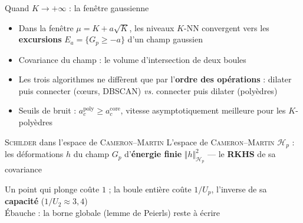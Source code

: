 \begin{frame}{Quand $K \to +\infty$ : la fenêtre gaussienne}
    \begin{itemize}
        \setlength{\itemsep}{10pt}
        \item Dans la fenêtre $\mu = K + a\sqrt K$, les niveaux $K$-NN convergent vers les \textbf{excursions} $E_a = \{G_p \ge -a\}$ d'un champ gaussien
        \item Covariance du champ : le volume d'intersection de deux boules
        \item Les trois algorithmes ne diffèrent que par l'\textbf{ordre des opérations} : dilater puis connecter (cœurs, DBSCAN) \emph{vs.} connecter puis dilater (polyèdres)
        \item Seuils de bruit : $a_c^{\mathrm{poly}} \ge a_c^{\mathrm{core}}$, vitesse asymptotiquement meilleure pour les $K$-polyèdres
    \end{itemize}
\end{frame}

\begin{frame}[t]{\textsc{Schilder} dans l'espace de \textsc{Cameron}--\textsc{Martin}}
    \small
    L'espace de \textsc{Cameron}--\textsc{Martin} $\mathcal H_p$  : les déformations $h$ du champ
    $G_p$ d'\textbf{énergie finie} $\Vert h\Vert^2_{\mathcal H_p}$ --- le \textbf{RKHS} de sa covariance 

    \vspace{0.10cm}
    \begin{center}
    \end{center}

    \vspace{0.08cm}
    \begin{center}
        \resizebox{0.46\textwidth}{!}{}
    \end{center}

    \vspace{0.04cm}
    \begin{center}
        Un point qui plonge coûte $1$ ; la boule entière coûte $1/U_p$, l'inverse de sa \textbf{capacité}
        ($1/U_2 \approx 3{,}4$)\\[2pt]
        {\color{inria-rouge}Ébauche : la borne globale (lemme de Peierls) reste à écrire}
    \end{center}
\end{frame}

